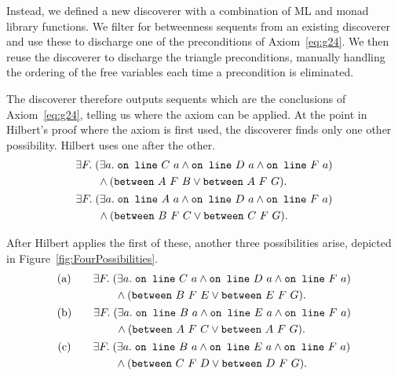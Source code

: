 Instead, we defined a new discoverer  with a combination of ML and monad library functions. We filter for betweenness sequents from an existing discoverer and use these to discharge one of the preconditions of Axiom~\ref{eq:g24}. We then reuse the discoverer  to discharge the triangle preconditions, manually handling the ordering of the free variables each time a precondition is eliminated. 

The  discoverer therefore outputs sequents which are the conclusions of Axiom~\ref{eq:g24}, telling us where the axiom can be applied. At the point in Hilbert's proof where the axiom is first used, the discoverer finds only one other possibility. Hilbert uses one after the other.
\begin{gather*}
\begin{split}
&\exists F.\; (\exists a.\; \code{on\ line}\ C\ a \wedge \code{on\ line}\ D\ a \wedge \code{on\ line}\ F\ a)\\
&\qquad \wedge (\between{A}{F}{B} \vee \between{A}{F}{G}).
\end{split}\\
\begin{split}
&\exists F.\; (\exists a.\; \code{on\ line}\ A\ a \wedge \code{on\ line}\ D\ a \wedge \code{on\ line}\ F\ a)\\
&\qquad \wedge (\between{B}{F}{C} \vee \between{C}{F}{G}).
\end{split}
\end{gather*}

After Hilbert applies the first of these, another three possibilities arise, depicted in Figure~\ref{fig:FourPossibilities}.
\begin{gather*}
\begin{split}\text{(a)}\qquad
&\exists F.\; (\exists a.\; \code{on\ line}\ C\ a \wedge \code{on\ line}\ D\ a \wedge \code{on\ line}\ F\ a)\\
&\qquad \wedge (\between{B}{F}{E} \vee \between{E}{F}{G}).
\end{split}\\
\begin{split}\text{(b)}\qquad
&\exists F.\;(\exists a.\; \code{on\ line}\ B\ a \wedge \code{on\ line}\ E\ a \wedge \code{on\ line}\ F\ a)\\
&\qquad \wedge (\between{A}{F}{C} \vee \between{A}{F}{G}).
\end{split}\\
\begin{split}\text{(c)}\qquad
&\exists F.\;(\exists a.\; \code{on\ line}\ B\ a \wedge \code{on\ line}\ E\ a \wedge \code{on\ line}\ F\ a)\\
&\qquad \wedge (\between{C}{F}{D} \vee \between{D}{F}{G}).
\end{split}\\
\end{gather*}

